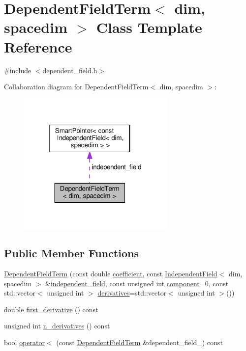 \hypertarget{class_dependent_field_term}{}\section{Dependent\+Field\+Term$<$ dim, spacedim $>$ Class Template Reference}
\label{class_dependent_field_term}


{\ttfamily \#include $<$dependent\+\_\+field.\+h$>$}



Collaboration diagram for Dependent\+Field\+Term$<$ dim, spacedim $>$\+:
\nopagebreak
\begin{figure}[H]
\begin{center}
\leavevmode
\includegraphics[width=220pt]{class_dependent_field_term__coll__graph}
\end{center}
\end{figure}
\subsection*{Public Member Functions}
\begin{DoxyCompactItemize}
\item 
\hyperlink{class_dependent_field_term_a149a09f602b0baadba9033d6a8da448c}{Dependent\+Field\+Term} (const double \hyperlink{class_dependent_field_term_a59a9183a32ac55fb728f3797b68a9f8f}{coefficient}, const \hyperlink{class_independent_field}{Independent\+Field}$<$ dim, spacedim $>$ \&\hyperlink{class_dependent_field_term_a89d1c3fea36e6fe105232097a321e095}{independent\+\_\+field}, const unsigned int \hyperlink{class_dependent_field_term_ac6f3ac40d4ee2c8b9f9bbdfa34079b74}{component}=0, const std\+::vector$<$ unsigned int $>$ \hyperlink{class_dependent_field_term_af09c5452c3e8e71e9ee99db304b90135}{derivatives}=std\+::vector$<$ unsigned int $>$())
\item 
double \hyperlink{class_dependent_field_term_a9c477ae87acdea43960f399ca2dd10b9}{first\+\_\+derivative} () const 
\item 
unsigned int \hyperlink{class_dependent_field_term_aa1c7aeb391135d4cafa1f208c15517ec}{n\+\_\+derivatives} () const 
\item 
bool \hyperlink{class_dependent_field_term_ab9934d7ad41e3a52073cc11293e7178b}{operator$<$} (const \hyperlink{class_dependent_field_term}{Dependent\+Field\+Term} \&dependent\+\_\+field\+\_) const 
\end{DoxyCompactItemize}
